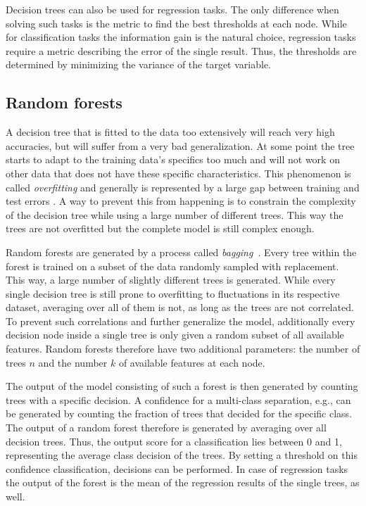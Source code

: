 Decision trees can also be used for regression tasks. The only difference when
solving such tasks is the metric to find the best thresholds at each node.
While for classification tasks the information gain is the natural choice, regression
tasks require a metric describing the error of the single result. Thus, the
thresholds are determined by minimizing the variance of the target variable.

\subsection{Random forests}
%
A decision tree that is fitted to the data too extensively will reach
very high accuracies, but will suffer from a very bad generalization. At some
point the tree starts to adapt to the training data's specifics too much and
will not work on other data that does not have these specific characteristics.
This phenomenon is called \textit{overfitting} and generally is represented by
a large gap between training and test errors \cite{goodfellow}. A way to
prevent this from happening is to constrain the complexity of the decision tree
while using a large number of different trees. This way the trees are not
overfitted but the complete model is still complex enough.

Random forests are generated by a process called
\textit{bagging}~\cite{bagging}. Every tree within the forest is trained on a
subset of the data randomly sampled with replacement. This way, a large number
of slightly different trees is generated. While every single decision tree is
still prone to overfitting to fluctuations in its respective dataset, averaging over
all of them is not, as long as the trees are not correlated. To prevent such
correlations and further generalize the model, additionally every decision node
inside a single tree is only given a random subset of all available features.
Random forests therefore have two additional parameters: the number of trees
$n$ and the number $k$ of available features at each node.

The output of the model consisting of such a forest is then generated
by counting trees with a specific decision. A confidence for a multi-class
separation, e.g., can be generated by counting the fraction of trees that
decided for the specific class. The output of a random forest therefore is generated by averaging over all decision trees. Thus, the output score for a classification lies between \num{0} and \num{1}, representing the average class decision of the trees. By setting a threshold on this confidence
classification, decisions can be performed. In case of regression tasks the
output of the forest is the mean of the regression results of the single trees,
as well.

